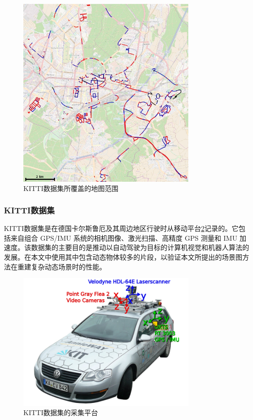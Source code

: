 \begin{figure}[ht]
    \centering
    \includegraphics[width=0.8\textwidth]{undergraduate-thesis/images/experiments/kitti-map.png}
    \caption{KITTI数据集所覆盖的地图范围}
    \label{fig:exp-kitti-map}
\end{figure}

\subsubsection{KITTI数据集}
KITTI数据集\cite{geiger_are_2012,geiger_vision_2013}是在德国卡尔斯鲁厄及其周边地区行驶时从移动平台\ref{fig:exp-kitti-platform}记录的。它包括来自组合 GPS/IMU 系统的相机图像、激光扫描、高精度 GPS 测量和 IMU 加速度。该数据集的主要目的是推动以自动驾驶为目标的计算机视觉和机器人算法的发展。在本文中使用其中包含动态物体较多的片段，以验证本文所提出的场景图方法在重建复杂动态场景时的性能。
\begin{figure}[ht]
    \centering
    \includegraphics[width=0.8\textwidth]{undergraduate-thesis/images/experiments/kitti-platform.png}
    \caption{KITTI数据集的采集平台}
    \label{fig:exp-kitti-platform}
\end{figure}


